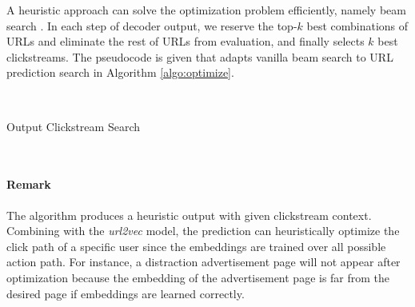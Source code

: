 A heuristic approach can solve the optimization problem efficiently, namely beam search 
\cite{DBLP:journals/corr/abs-1211-3711}.
In each step of decoder output, we reserve the top-$k$ best combinations of URLs and 
eliminate the rest of URLs from evaluation, and finally selects $k$ best clickstreams.
The pseudocode is given that adapts vanilla beam search to URL prediction search 
in Algorithm \ref{algo:optimize}.

~\\

\begin{algorithm}[H]
\label{algo:optimize}
\SetAlgoLined
{}
\caption{Output Clickstream Search}
\end{algorithm}

~\\

\paragraph{Remark} The algorithm produces a heuristic output with given clickstream context. 
Combining with the \emph{url2vec} model, the prediction
can heuristically optimize the click path of a specific user since the embeddings 
are trained over all possible action path. For instance, 
a distraction advertisement page will not appear
after optimization because the embedding of the advertisement page 
is far from the desired page if embeddings are learned correctly.

\cleardoublepage